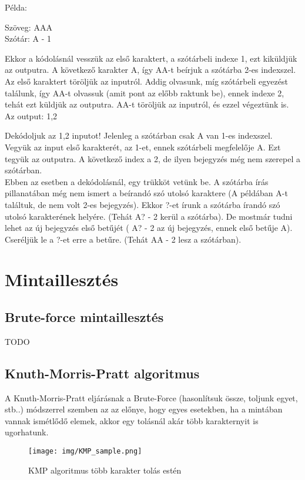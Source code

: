 \documentclass[margin=0px]{article}
\begin{document}
\begin{description}
        Példa:

        Szöveg: AAA\\
        Szótár: A - 1

        Ekkor a kódolásnál vesszük az első karaktert, a szótárbeli indexe 1, ezt kiküldjük az outputra. A következő karakter A, így AA-t beírjuk a szótárba 2-es indexszel. Az első karaktert töröljük az inputról. Addig olvasunk, míg szótárbeli egyezést találunk, így AA-t olvassuk (amit pont az előbb raktunk be), ennek indexe 2, tehát ezt küldjük az outputra. AA-t töröljük az inputról, és ezzel végeztünk is. Az output: 1,2

        Dekódoljuk az 1,2 inputot! Jelenleg a szótárban csak A van 1-es indexszel. Vegyük az input első karakterét, az 1-et, ennek szótárbeli megfelelője A. Ezt tegyük az outputra. A következő index a 2, de ilyen bejegyzés még nem szerepel a szótárban. \\

        Ebben az esetben a dekódolásnál, egy trükköt vetünk be. A szótárba írás pillanatában még nem ismert a beírandó szó utolsó karaktere (A példában A-t találtuk, de nem volt 2-es bejegyzés). Ekkor ?-et írunk a szótárba írandó szó utolsó karakterének helyére. (Tehát A? - 2 kerül a szótárba). De mostmár tudni lehet az új bejegyzés első betűjét ( A? - 2 az új bejegyzés, ennek első betűje A). Cseréljük le a ?-et erre a betűre. (Tehát AA - 2 lesz a szótárban).
\end{description}
\section{Mintaillesztés}
\subsection{Brute-force mintaillesztés}
TODO

\subsection{Knuth-Morris-Pratt algoritmus}
A Knuth-Morris-Pratt eljárásnak a Brute-Force (hasonlítsuk össze, toljunk egyet, stb..) módszerrel szemben az az előnye, hogy egyes esetekben, ha a mintában vannak ismétlődő elemek, akkor egy tolásnál akár több karakternyit is ugorhatunk.

\begin{figure}[H]
    \centering
    \texttt{[image: img/KMP\_sample.png]}
    \caption{KMP algoritmus több karakter tolás estén}
    \label{fig:KMP_sample}
\end{figure}
\end{document}

